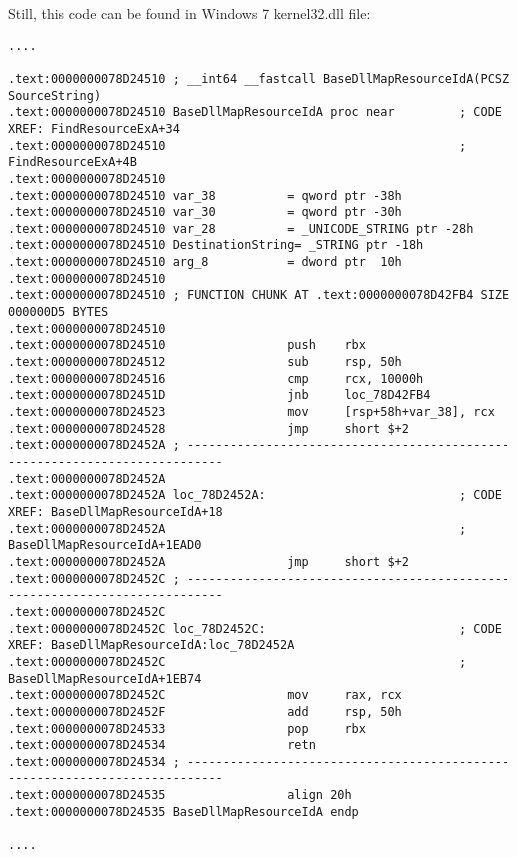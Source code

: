 Still, this code can be found in Windows 7 kernel32.dll file:

\begin{lstlisting}[style=customasm]
....

.text:0000000078D24510 ; __int64 __fastcall BaseDllMapResourceIdA(PCSZ SourceString)
.text:0000000078D24510 BaseDllMapResourceIdA proc near         ; CODE XREF: FindResourceExA+34
.text:0000000078D24510                                         ; FindResourceExA+4B
.text:0000000078D24510
.text:0000000078D24510 var_38          = qword ptr -38h
.text:0000000078D24510 var_30          = qword ptr -30h
.text:0000000078D24510 var_28          = _UNICODE_STRING ptr -28h
.text:0000000078D24510 DestinationString= _STRING ptr -18h
.text:0000000078D24510 arg_8           = dword ptr  10h
.text:0000000078D24510
.text:0000000078D24510 ; FUNCTION CHUNK AT .text:0000000078D42FB4 SIZE 000000D5 BYTES
.text:0000000078D24510
.text:0000000078D24510                 push    rbx
.text:0000000078D24512                 sub     rsp, 50h
.text:0000000078D24516                 cmp     rcx, 10000h
.text:0000000078D2451D                 jnb     loc_78D42FB4
.text:0000000078D24523                 mov     [rsp+58h+var_38], rcx
.text:0000000078D24528                 jmp     short $+2
.text:0000000078D2452A ; ---------------------------------------------------------------------------
.text:0000000078D2452A
.text:0000000078D2452A loc_78D2452A:                           ; CODE XREF: BaseDllMapResourceIdA+18
.text:0000000078D2452A                                         ; BaseDllMapResourceIdA+1EAD0
.text:0000000078D2452A                 jmp     short $+2
.text:0000000078D2452C ; ---------------------------------------------------------------------------
.text:0000000078D2452C
.text:0000000078D2452C loc_78D2452C:                           ; CODE XREF: BaseDllMapResourceIdA:loc_78D2452A
.text:0000000078D2452C                                         ; BaseDllMapResourceIdA+1EB74
.text:0000000078D2452C                 mov     rax, rcx
.text:0000000078D2452F                 add     rsp, 50h
.text:0000000078D24533                 pop     rbx
.text:0000000078D24534                 retn
.text:0000000078D24534 ; ---------------------------------------------------------------------------
.text:0000000078D24535                 align 20h
.text:0000000078D24535 BaseDllMapResourceIdA endp

....


\end{lstlisting}
